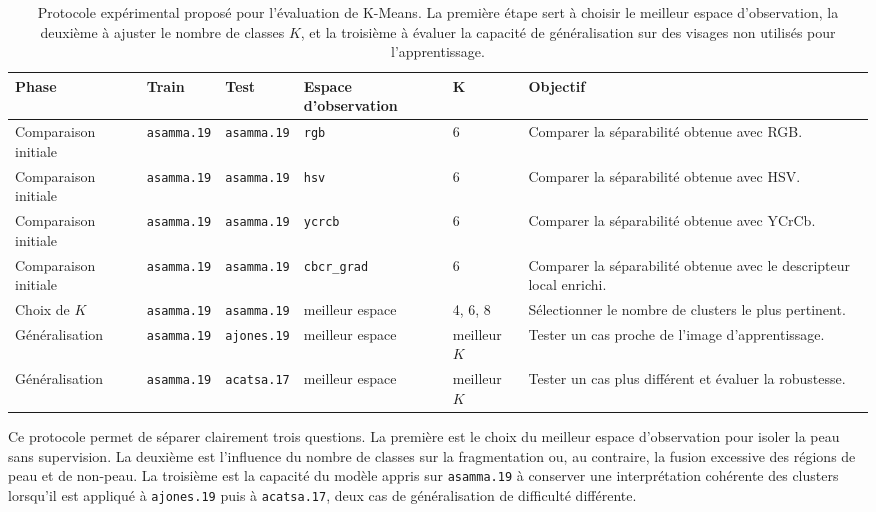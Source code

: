 \begin{table}[!t]
\centering
\scriptsize
\caption{Protocole exp\'erimental propos\'e pour l'\'evaluation de K-Means. La premi\`ere \'etape sert \`a choisir le meilleur espace d'observation, la deuxi\`eme \`a ajuster le nombre de classes \(K\), et la troisi\`eme \`a \'evaluer la capacit\'e de g\'en\'eralisation sur des visages non utilis\'es pour l'apprentissage.}
\label{tab:kmeans_protocol}
\begin{tabular}{|p{2.6cm}|p{1.9cm}|p{1.9cm}|p{2.8cm}|p{1.2cm}|p{5.4cm}|}
\hline
\textbf{Phase} & \textbf{Train} & \textbf{Test} & \textbf{Espace d'observation} & \textbf{K} & \textbf{Objectif} \\
\hline
Comparaison initiale & \texttt{asamma.19} & \texttt{asamma.19} & \texttt{rgb} & 6 & Comparer la s\'eparabilit\'e obtenue avec RGB. \\
\hline
Comparaison initiale & \texttt{asamma.19} & \texttt{asamma.19} & \texttt{hsv} & 6 & Comparer la s\'eparabilit\'e obtenue avec HSV. \\
\hline
Comparaison initiale & \texttt{asamma.19} & \texttt{asamma.19} & \texttt{ycrcb} & 6 & Comparer la s\'eparabilit\'e obtenue avec YCrCb. \\
\hline
Comparaison initiale & \texttt{asamma.19} & \texttt{asamma.19} & \texttt{cbcr\_grad} & 6 & Comparer la s\'eparabilit\'e obtenue avec le descripteur local enrichi. \\
\hline
Choix de \(K\) & \texttt{asamma.19} & \texttt{asamma.19} & meilleur espace & 4, 6, 8 & S\'electionner le nombre de clusters le plus pertinent. \\
\hline
G\'en\'eralisation & \texttt{asamma.19} & \texttt{ajones.19} & meilleur espace & meilleur \(K\) & Tester un cas proche de l'image d'apprentissage. \\
\hline
G\'en\'eralisation & \texttt{asamma.19} & \texttt{acatsa.17} & meilleur espace & meilleur \(K\) & Tester un cas plus diff\'erent et \'evaluer la robustesse. \\
\hline
\end{tabular}
\end{table}

Ce protocole permet de s\'eparer clairement trois questions. La premi\`ere est le choix du meilleur espace d'observation pour isoler la peau sans supervision. La deuxi\`eme est l'influence du nombre de classes sur la fragmentation ou, au contraire, la fusion excessive des r\'egions de peau et de non-peau. La troisi\`eme est la capacit\'e du mod\`ele appris sur \texttt{asamma.19} \`a conserver une interpr\'etation coh\'erente des clusters lorsqu'il est appliqu\'e \`a \texttt{ajones.19} puis \`a \texttt{acatsa.17}, deux cas de g\'en\'eralisation de difficult\'e diff\'erente.

